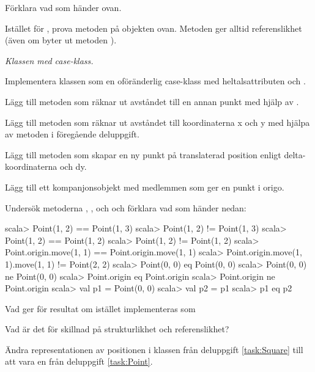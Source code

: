 \Subtask Förklara vad som händer ovan.

\Subtask Istället för \code{==}, prova metoden  på objekten ovan. Metoden  ger alltid referenslikhet (även om byter ut metoden ).

\Task \label{task:Point} \emph{Klassen  med case-klass.} 

\Subtask Implementera klassen  som en oföränderlig case-klass med heltalsattributen  och . 

\Subtask Lägg till metoden  som räknar ut avståndet till en annan punkt med hjälp av .

\Subtask Lägg till metoden  som räknar ut avståndet till koordinaterna x och y med hjälpa av metoden i föregående deluppgift.

\Subtask Lägg till metoden  som skapar en ny punkt på translaterad position enligt delta-koordinaterna  och {dy}.

\Subtask Lägg till ett kompanjonsobjekt med medlemmen  som ger en punkt i origo.

\Subtask Undersök metoderna \code{==}, \code{!=},  och  och förklara vad som händer nedan:
\begin{REPL}
scala> Point(1, 2) == Point(1, 3)
scala> Point(1, 2) != Point(1, 3)
scala> Point(1, 2) == Point(1, 2)
scala> Point(1, 2) != Point(1, 2)
scala> Point.origin.move(1, 1) == Point.origin.move(1, 1)
scala> Point.origin.move(1, 1).move(1, 1) != Point(2, 2)
scala> Point(0, 0) eq Point(0, 0)
scala> Point(0, 0) ne Point(0, 0)
scala> Point.origin eq Point.origin
scala> Point.origin ne Point.origin
scala> val p1 = Point(0, 0)
scala> val p2 = p1
scala> p1 eq p2
\end{REPL}

\Subtask Vad ger  för resultat om  istället  implementeras som 

\Subtask\Pen Vad är det för skillnad på strukturlikhet och referenslikhet?

\Task \label{task:PointSquare}Ändra representationen av positionen i klassen  från deluppgift \ref{task:Square} till att vara en  från deluppgift \ref{task:Point}.


